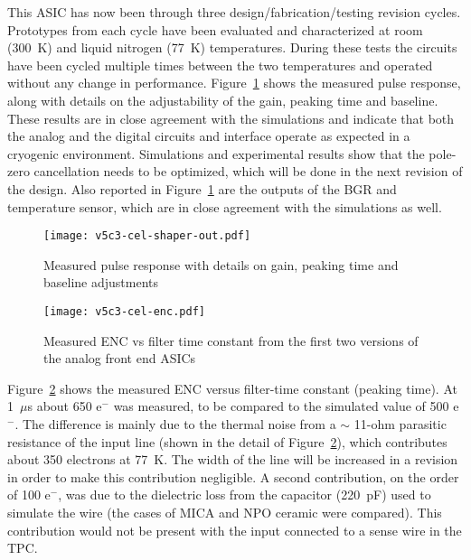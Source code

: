 This ASIC has now been through three design/fabrication/testing revision cycles. Prototypes from each cycle have been evaluated and characterized at room (300~K) and liquid nitrogen
(77~K) temperatures. During these tests the circuits have been cycled multiple times
between the two temperatures and operated without any change in
performance. Figure~\ref{fig:tpc-elec-shaper-out} shows the measured pulse response, along with
details on the adjustability of the gain, peaking time and baseline.
These results are in close agreement with the simulations and indicate
that both the analog and the digital circuits and interface operate as
expected in a cryogenic environment. Simulations and experimental results
show that the pole-zero cancellation needs to be optimized, which will
be done in the next revision of the design. Also reported in Figure~\ref{fig:tpc-elec-shaper-out}  are
the outputs of the BGR and temperature sensor, which are in close
agreement with the simulations as well.

\begin{figure}[htbp]
\centering
\texttt{[image: v5c3-cel-shaper-out.pdf]}
\caption[Measured pulse response with details]{Measured pulse response with details on gain, peaking time and baseline adjustments}
\label{fig:tpc-elec-shaper-out}
\end{figure}


\begin{figure}[htbp]
\centering
\texttt{[image: v5c3-cel-enc.pdf]}
\caption[Measured ENC vs filter time constant]{Measured ENC vs filter time constant from the first two versions of the analog front end ASICs}
\label{fig:tpc-elec-enc}
\end{figure}


Figure~\ref{fig:tpc-elec-enc} shows the measured ENC versus filter-time constant (peaking time).
At 1~$\mu$s about 650 e$^{-}$ was measured,
to be compared to the simulated value of 500 e$^{-}$. The difference is
mainly due to the thermal noise from a $\sim$
11-ohm parasitic resistance of the input
line (shown in the detail of Figure~\ref{fig:tpc-elec-enc}), which contributes about 350
electrons at 77~K. The width of the line will be increased in a
revision in order to make this contribution negligible. A second
contribution, on the order of 100 e$^{-}$, was due to the dielectric
loss from the  capacitor (220~pF) used to simulate the wire (the cases of MICA and NPO ceramic were compared). This contribution would not be
present with the input connected to a sense wire in the TPC.

